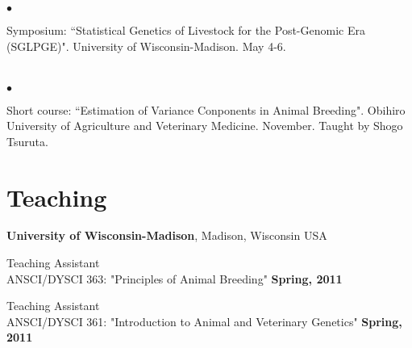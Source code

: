 \documentclass[margin,line,10pt]{res}
\newenvironment{list2}{
  \begin{list}{$\bullet$}{%
      \setlength{\itemsep}{0in}
      \setlength{\parsep}{0in} \setlength{\parskip}{0in}
      \setlength{\topsep}{0in} \setlength{\partopsep}{0in} 
      \setlength{\leftmargin}{0.2in}}}{\end{list}}
\begin{document}
\begin{resume}
\section{}
\begin{list2}
\item Symposium: ``Statistical Genetics of Livestock for the Post-Genomic Era (SGLPGE)". University of Wisconsin-Madison. May 4-6. 
\end{list2}  

\section{}
\begin{list2}
\item Short course: ``Estimation of Variance Conponents in Animal Breeding". Obihiro University of Agriculture and Veterinary Medicine. November. 
Taught by Shogo Tsuruta.  
\end{list2}  







\vspace{0.5cm}
\section{\sc Teaching}
{\bf University of Wisconsin-Madison}, Madison, Wisconsin USA 
\vspace{.01pt}

Teaching Assistant \\
ANSCI/DYSCI 363: "Principles of Animal Breeding"     \hfill {\bf Spring, 2011}


\vspace{.01pt}
Teaching Assistant \\
ANSCI/DYSCI 361: "Introduction to Animal and Veterinary Genetics"     \hfill {\bf Spring, 2011} 








\vspace{0.5cm}

\end{resume}
\end{document}

